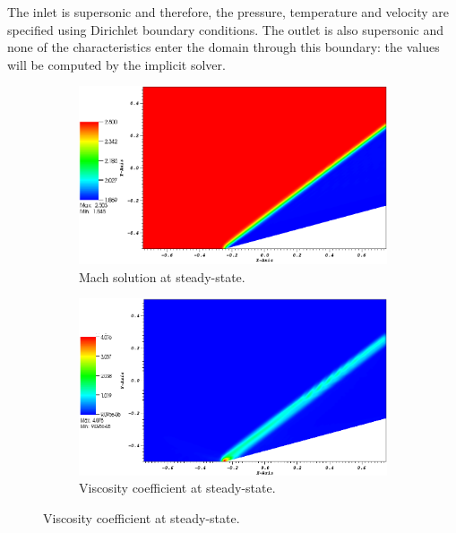 \documentclass[preprint,10pt]{elsarticle}
\begin{document}
%
The inlet is supersonic and therefore, the pressure, temperature and velocity are specified using Dirichlet boundary conditions. The outlet is also supersonic and none of the characteristics enter the domain through this boundary: the values will be computed by the implicit solver.
%
\begin{figure}[H]
        \centering
        \begin{subfigure}[b]{0.52\textwidth}
                \centering
                \includegraphics[width=\textwidth]{CompressionCorner2D_mach.png}
                \caption{Mach solution at steady-state.}
                \label{fig:2d_corner_mach}
        \end{subfigure}%
        \begin{subfigure}[b]{0.52\textwidth}
                \centering
                \includegraphics[width=\textwidth]{CompressionCorner2D_viscosity.png}
                \caption{Viscosity coefficient at steady-state.}
                \label{fig:2d_corner_visc}
        \end{subfigure}
        

\end{figure}
\end{document}
